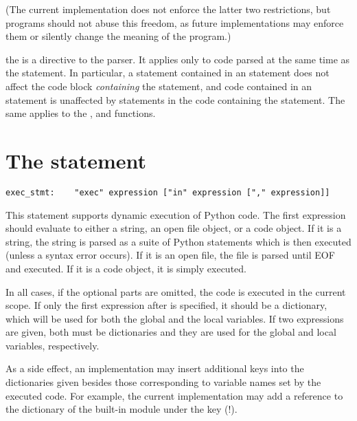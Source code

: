 (The current implementation does not enforce the latter two
restrictions, but programs should not abuse this freedom, as future
implementations may enforce them or silently change the meaning of the
program.)

the  is a directive to the parser.  It
applies only to code parsed at the same time as the 
statement.  In particular, a  statement contained in an
 statement does not affect the code block \emph{containing}
the  statement, and code contained in an 
statement is unaffected by  statements in the code
containing the  statement.  The same applies to the
,  and  functions.

\section{The  statement \label{exec}}

\begin{verbatim}
exec_stmt:    "exec" expression ["in" expression ["," expression]]
\end{verbatim}

This statement supports dynamic execution of Python code.  The first
expression should evaluate to either a string, an open file object, or
a code object.  If it is a string, the string is parsed as a suite of
Python statements which is then executed (unless a syntax error
occurs).  If it is an open file, the file is parsed until EOF and
executed.  If it is a code object, it is simply executed.

In all cases, if the optional parts are omitted, the code is executed
in the current scope.  If only the first expression after 
is specified, it should be a dictionary, which will be used for both
the global and the local variables.  If two expressions are given,
both must be dictionaries and they are used for the global and local
variables, respectively.

As a side effect, an implementation may insert additional keys into
the dictionaries given besides those corresponding to variable names
set by the executed code.  For example, the current implementation
may add a reference to the dictionary of the built-in module
 under the key  (!).

